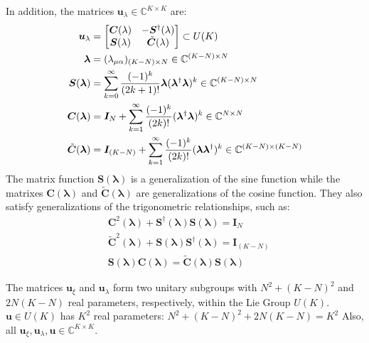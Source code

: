 \documentclass{aux/ttuthes2007}
\newcommand{\paren}[1]{\left( #1 \right)}
\newcommand{\elec}{N}
\newcommand{\orb}{K}
\newcommand{\uo}[1]{
		\IfEqCase{#1}{
			{0}{\mu}
			{1}{\nu}
			{2}{\xi}
		}[\PackageError{uo}{Undefined option to uo: #1}{}]
}
\newcommand{\oo}[1]{
		\IfEqCase{#1}{
			{0}{\alpha}
			{1}{\beta}
			{2}{\gamma}
		}[\PackageError{unocorb}{Undefined option to unuo: #1}{}]
}
\begin{document}
%
In addition, the matrices $\bm u_\lambda \in \mathbb{C}^{\orb \times \orb}$ are:
%
\begin{equation*}
\begin{split}
	\bm u_\lambda &= \begin{bmatrix}\bm C(\lambda) & -\bm S^\dagger(\lambda) \\ \bm S(\lambda) & \tilde {\bm C}(\lambda)\end{bmatrix} \subset U(\orb) \\
	\bm \lambda &= (\lambda_{\uo 0 \oo 0})_{(\orb - \elec)\times \elec} \in \mathbb{C}^{\paren{\orb - \elec} \times \elec} \\
	\bm S(\bm \lambda) &= \sum_{k=0}^\infty \frac{(-1)^k}{(2k + 1)!}\bm \lambda(\bm \lambda^\dagger\bm \lambda)^k \in \mathbb{C}^{\paren{\orb - \elec} \times \elec}\\
	\bm C(\bm \lambda) &= \bm I_\elec + \sum_{k=1}^\infty \frac{(-1)^k}{(2k)!}(\bm \lambda^\dagger\bm \lambda)^k \in \mathbb{C}^{\elec \times \elec}\\
	\tilde {\bm C}(\bm \lambda) &= \bm I_{(\orb - \elec)} + \sum_{k=1}^\infty \frac{(-1)^k}{(2k)!}(\bm \lambda\bm \lambda^\dagger)^k \in \mathbb{C}^{\paren{\orb - \elec} \times \paren{\orb - \elec}}
\end{split}
\end{equation*}
%
The matrix function $\bm S(\bm \lambda)$ is a generalization of the sine function while the matrixes $\bm C(\bm \lambda)$ and $\tilde {\bm C}(\bm \lambda)$ are generalizations of the cosine function. They also satisfy generalizations of the trigonometric relationships, such as:
%
\begin{equation*}
\begin{split}
	&\bm C^2(\bm \lambda) + \bm S^\dagger(\bm \lambda)\bm S(\bm \lambda) = \bm I_{\elec} \\
	&\tilde{\bm C}^2(\bm \lambda) + \bm S(\bm \lambda)\bm S^\dagger(\bm \lambda) = \bm I_{\paren{\orb - \elec}} \\
	&\bm S(\bm \lambda)\bm C(\bm \lambda) = \tilde{\bm C}(\bm \lambda)\bm S(\bm \lambda)
\end{split}
\end{equation*}

The matrices $\bm u_\xi$ and $\bm u_\lambda$ form two unitary subgroups with 
$\elec^2 + \paren{\orb - \elec}^2$ 
and 
$2\elec\paren{\orb - \elec}$
real parameters, respectively, within the Lie Group 
$U(\orb)$. $\bm u \in U(\orb)$ has $\orb^2$ real parameters:
$\elec^2 + \paren{\orb - \elec}^2 + 2\elec\paren{\orb - \elec} = \orb^2$
Also, all 
$\bm u_\xi, \bm u_\lambda, \bm u \in \mathbb{C}^{\orb\times\orb}$.
\end{document}
